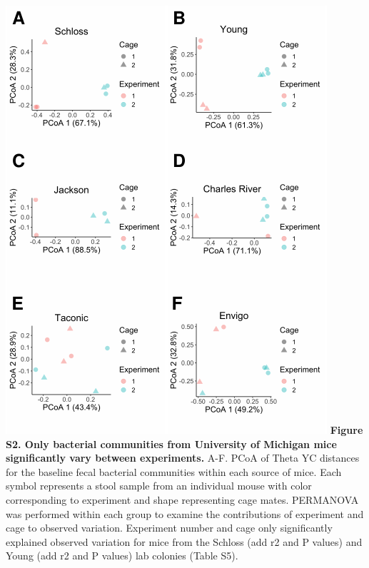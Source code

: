 \documentclass[11pt,]{article}
\begin{document}
\newpage

\includegraphics{figure_S2.pdf} \textbf{Figure S2. Only bacterial
communities from University of Michigan mice significantly vary between
experiments.} A-F. PCoA of Theta YC distances for the baseline fecal
bacterial communities within each source of mice. Each symbol represents
a stool sample from an individual mouse with color corresponding to
experiment and shape representing cage mates. PERMANOVA was performed
within each group to examine the contributions of experiment and cage to
observed variation. Experiment number and cage only significantly
explained observed variation for mice from the Schloss (add r2 and P
values) and Young (add r2 and P values) lab colonies (Table S5).

\newpage
\end{document}
